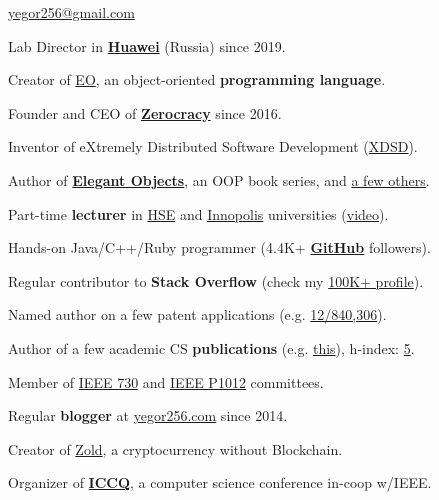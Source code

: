 \documentclass{yb}
\begin{document}
\sffamily

\ybPrintPhoto{}

{\scshape\bfseries\Large {}}\newline
\href{mailto:yegor256@gmail.com}{yegor256@gmail.com}

\vspace{1em}

Lab Director in \textbf{\href{https://www.huawei.com}{Huawei}} (Russia) since 2019.

Creator of \href{https://www.eolang.org}{EO}, an object-oriented \textbf{programming language}.

Founder and CEO of \textbf{\href{https://www.zerocracy.com}{Zerocracy}} since 2016.

Inventor of eXtremely Distributed Software Development (\href{https://www.xdsd.org}{XDSD}).

Author of \textbf{\href{https://www.yegor256.com/elegant-objects.html}{Elegant Objects}},
  an OOP book series, and \href{https://www.yegor256.com/books.html}{a few others}.

Part-time \textbf{lecturer} in \href{https://www.hse.ru/en/}{HSE}
  and \href{https://innopolis.university/en/}{Innopolis} universities
  (\href{https://www.youtube.com/playlist?list=PLaIsQH4uc08y14wCJMeffS2yErN4QpB8m}{video}).

Hands-on Java/C++/Ruby programmer
  (4.4K+ \textbf{\href{https://github.com/yegor256}{GitHub}} followers).

Regular contributor to \textbf{Stack Overflow}
  (check my \href{https://stackexchange.com/users/63162/yegor256}{100K+ profile}).

Named author on a few patent applications
  (e.g. \href{https://www.google.com/patents/US20120023476}{12/840,306}).

Author of a few academic CS \textbf{publications}
  (e.g. \href{https://link.springer.com/chapter/10.1007/978-3-642-02152-7_6}{this}),
  h-index: \href{https://scholar.google.com/citations?user=cYmXh60AAAAJ}{5}.

Member of \href{http://standards.ieee.org/develop/wg/730.html}{IEEE 730} and
  \href{https://standards.ieee.org/ieee/1012/7324/}{IEEE P1012} committees.

Regular \textbf{blogger} at \href{https://www.yegor256.com/}{yegor256.com} since 2014.

Creator of \href{https://www.zold.io}{Zold}, a cryptocurrency without Blockchain.

Organizer of \href{https://www.iccq.ru}{\textbf{ICCQ}}, a computer science conference in-coop w/IEEE.
\end{document}
